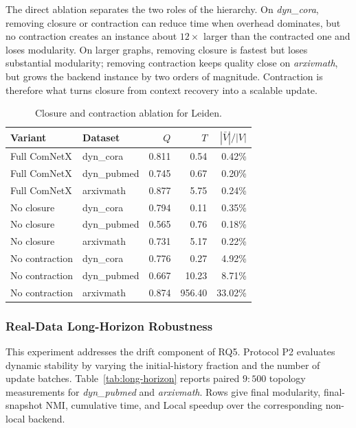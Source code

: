 \documentclass[conference]{IEEEtran}
\theoremstyle{definition}
\begin{document}
The direct ablation separates the two roles of the hierarchy. On
\textit{dyn\_cora}, removing closure or contraction can reduce time when
overhead dominates, but no contraction creates an instance about $12\times$
larger than the contracted one and loses modularity. On larger graphs, removing
closure is fastest but loses substantial modularity; removing contraction
keeps quality close on \textit{arxivmath}, but grows the backend instance by
two orders of magnitude. Contraction is therefore what turns closure from
context recovery into a scalable update.

\begin{table}[H]
\centering
\caption{Closure and contraction ablation for Leiden.}
\label{tab:closure-ablation}
\setlength{\tabcolsep}{2pt}
\scriptsize
\begin{tabular}{@{}llrrr@{}}
\toprule
\textbf{Variant} & \textbf{Dataset} & \textbf{$Q$} & \textbf{$T$} &
\textbf{$|\bar V|/|V|$} \\
\midrule
Full ComNetX & dyn\_cora & 0.811 & 0.54 & 0.42\% \\
Full ComNetX & dyn\_pubmed & 0.745 & 0.67 & 0.20\% \\
Full ComNetX & arxivmath & 0.877 & 5.75 & 0.24\% \\
No closure & dyn\_cora & 0.794 & 0.11 & 0.35\% \\
No closure & dyn\_pubmed & 0.565 & 0.76 & 0.18\% \\
No closure & arxivmath & 0.731 & 5.17 & 0.22\% \\
No contraction & dyn\_cora & 0.776 & 0.27 & 4.92\% \\
No contraction & dyn\_pubmed & 0.667 & 10.23 & 8.71\% \\
No contraction & arxivmath & 0.874 & 956.40 & 33.02\% \\
\bottomrule
\end{tabular}
\end{table}

\subsubsection{Real-Data Long-Horizon Robustness}

This experiment addresses the drift component of RQ5.
Protocol P2 evaluates dynamic stability by varying the initial-history fraction
and the number of update batches. Table~\ref{tab:long-horizon} reports paired
$9{:}500$ topology measurements for \textit{dyn\_pubmed} and
\textit{arxivmath}. Rows give final modularity, final-snapshot NMI, cumulative
time, and Local speedup over the corresponding non-local backend.
\end{document}
